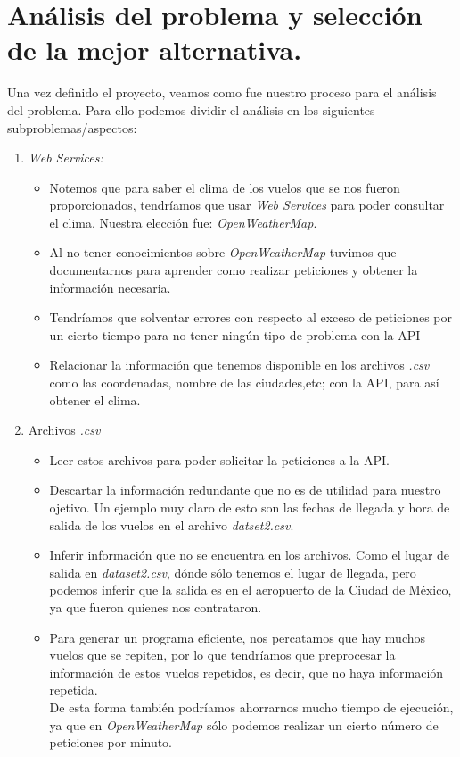 \documentclass[letterpaper]{article}
\begin{document}
\section{Análisis del problema y selección de la mejor alternativa. }
Una vez definido el proyecto, veamos como fue nuestro proceso para el análisis del problema. Para ello podemos dividir el análisis en los siguientes subproblemas/aspectos:
\begin{enumerate}
	\item \textit{Web Services: }
	\begin{itemize}
		\item Notemos que para saber el clima de los vuelos que se nos fueron proporcionados, tendríamos que usar \textit{Web Services} para poder consultar el clima. Nuestra elección fue: \textit{OpenWeatherMap}.
		\item 	Al no tener conocimientos sobre \textit{OpenWeatherMap} tuvimos que documentarnos para aprender como realizar peticiones y obtener la información necesaria.
		\item Tendríamos que solventar errores con respecto al exceso de peticiones por un cierto tiempo para no tener ningún tipo de problema con la API
		\item Relacionar la información que tenemos disponible en los archivos \textit{.csv} como las coordenadas, nombre de las ciudades,etc; con la API, para así obtener el clima.
	\end{itemize}
	\item Archivos \textit{.csv}
	\begin{itemize}
		\item Leer estos archivos para poder solicitar la peticiones a la API.
		\item Descartar la información redundante que no es de utilidad para nuestro ojetivo. Un ejemplo muy claro de esto son las fechas de llegada y hora de salida de los vuelos en el archivo \textit{datset2.csv}.
		\item Inferir información que no se encuentra en los archivos. Como el lugar de salida en \textit{dataset2.csv}, dónde sólo tenemos el lugar de llegada, pero podemos inferir que la salida es en el aeropuerto de la Ciudad de México, ya que fueron quienes nos contrataron.
		\item Para generar un programa eficiente, nos percatamos que hay muchos vuelos que se repiten, por lo que tendríamos que preprocesar la información de estos vuelos repetidos, es decir, que no haya información repetida.\\ De esta forma también podríamos ahorrarnos mucho tiempo de ejecución, ya que en \textit{OpenWeatherMap} sólo podemos realizar un cierto número de peticiones por minuto.

\end{itemize}
\end{enumerate}
\end{document}
